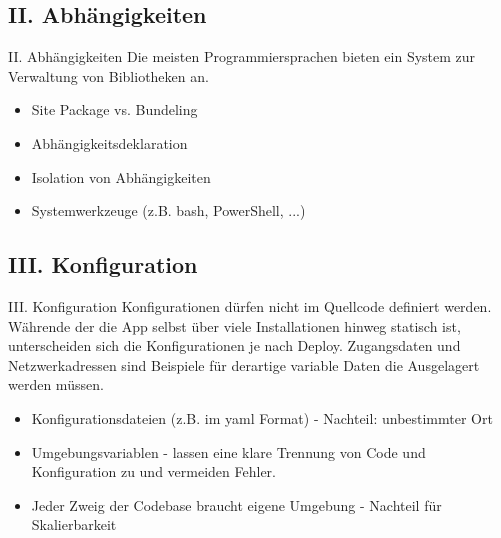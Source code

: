 \documentclass{beamer}
\begin{document}
			\subsection{II. Abhängigkeiten}
				\begin{frame}{II. Abhängigkeiten}
					Die meisten Programmiersprachen bieten ein System zur Verwaltung von Bibliotheken an.
					\begin{itemize}
						\item Site Package vs. Bundeling
						\item Abhängigkeitsdeklaration
						\item Isolation von Abhängigkeiten
						\item Systemwerkzeuge (z.B. bash, PowerShell, ...)
					\end{itemize}
				\end{frame}
			\subsection{III. Konfiguration}
				\begin{frame}{III. Konfiguration}
					Konfigurationen dürfen nicht im Quellcode definiert werden. Währende der die App selbst über viele Installationen hinweg statisch ist, unterscheiden sich die Konfigurationen je nach Deploy. Zugangsdaten und Netzwerkadressen sind Beispiele für derartige variable Daten die Ausgelagert werden müssen.
					\begin{itemize}
						\item Konfigurationsdateien (z.B. im yaml Format) - Nachteil: unbestimmter Ort
						\item Umgebungsvariablen - lassen eine klare Trennung von Code und Konfiguration zu und vermeiden Fehler. 
						\item Jeder Zweig der Codebase braucht eigene Umgebung - Nachteil für Skalierbarkeit
					\end{itemize} 
				\end{frame}
\end{document}
